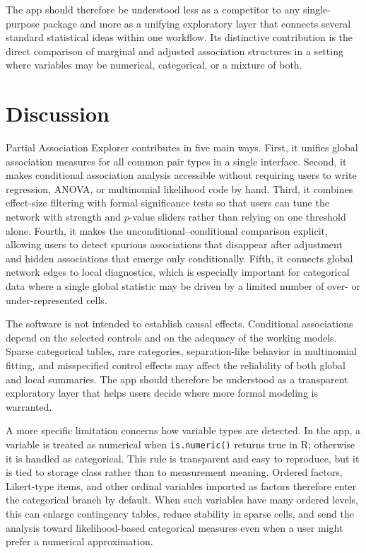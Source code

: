 \documentclass[11pt]{article}
\newcommand{\appname}{Partial Association Explorer}
\newcommand{\code}[1]{\texttt{#1}}
\newcommand{\proglang}[1]{\textsf{#1}}
\begin{document}
The app should therefore be understood less as a competitor to any
single-purpose package and more as a unifying exploratory layer that connects
several standard statistical ideas within one workflow. Its distinctive
contribution is the direct comparison of marginal and adjusted association
structures in a setting where variables may be numerical, categorical, or a
mixture of both.

\section{Discussion}
\label{sec:discussion}

\appname{} contributes in five main ways. First, it unifies global association
measures for all common pair types in a single interface. Second, it makes
conditional association analysis accessible without requiring users to write
regression, ANOVA, or multinomial likelihood code by hand. Third, it combines
effect-size filtering with formal significance tests so that users can tune the
network with strength and $p$-value sliders rather than relying on one
threshold alone. Fourth, it makes the unconditional--conditional comparison
explicit, allowing users to detect spurious associations that disappear after
adjustment and hidden associations that emerge only conditionally. Fifth, it
connects global network edges to local diagnostics,
which is especially important for categorical data where a single global
statistic may be driven by a limited number of over- or under-represented
cells.

The software is not intended to establish causal effects. Conditional
associations depend on the selected controls and on the adequacy of the working
models. Sparse categorical tables, rare categories, separation-like behavior
in multinomial fitting, and misspecified control effects may affect the
reliability of both global and local summaries. The app should therefore be
understood as a transparent exploratory layer that helps users decide where
more formal modeling is warranted.

A more specific limitation concerns how variable types are detected.
In the app, a variable is treated as numerical when
\code{is.numeric()} returns true in \proglang{R}; otherwise it is handled as
categorical. This rule is transparent and easy to reproduce, but it is tied to
storage class rather than to measurement meaning. Ordered factors, Likert-type
items, and other ordinal variables imported as factors therefore enter the
categorical branch by default. When such variables have many ordered levels,
this can enlarge contingency tables, reduce stability in sparse cells, and send
the analysis toward likelihood-based categorical measures even when a user might
prefer a numerical approximation.
\end{document}
